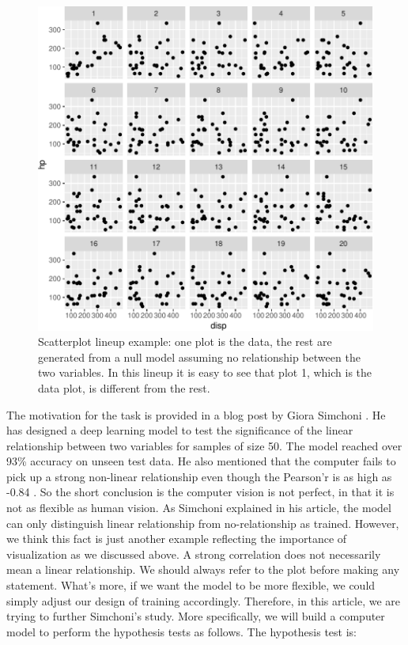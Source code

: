 \documentclass[12pt]{article}
\begin{document}
\begin{figure}
\centering
\includegraphics{pc_plots_files/figure-latex/lineup-1.pdf}
\caption{Scatterplot lineup example: one plot is the data, the rest are
generated from a null model assuming no relationship between the two
variables. In this lineup it is easy to see that plot 1, which is the
data plot, is different from the rest.}
\end{figure}

The motivation for the task is provided in a blog post by Giora Simchoni
\citep{SIM18}. He has designed a deep learning model to test the
significance of the linear relationship between two variables for
samples of size 50. The model reached over 93\% accuracy on unseen test
data. He also mentioned that the computer fails to pick up a strong
non-linear relationship even though the Pearson'r is as high as -0.84
\citep{SIM18}. So the short conclusion is the computer vision is not
perfect, in that it is not as flexible as human vision. As Simchoni
explained in his article, the model can only distinguish linear
relationship from no-relationship as trained. However, we think this
fact is just another example reflecting the importance of visualization
as we discussed above. A strong correlation does not necessarily mean a
linear relationship. We should always refer to the plot before making
any statement. What's more, if we want the model to be more flexible, we
could simply adjust our design of training accordingly. Therefore, in
this article, we are trying to further Simchoni's study. More
specifically, we will build a computer model to perform the hypothesis
tests as follows. The hypothesis test is:
\end{document}
